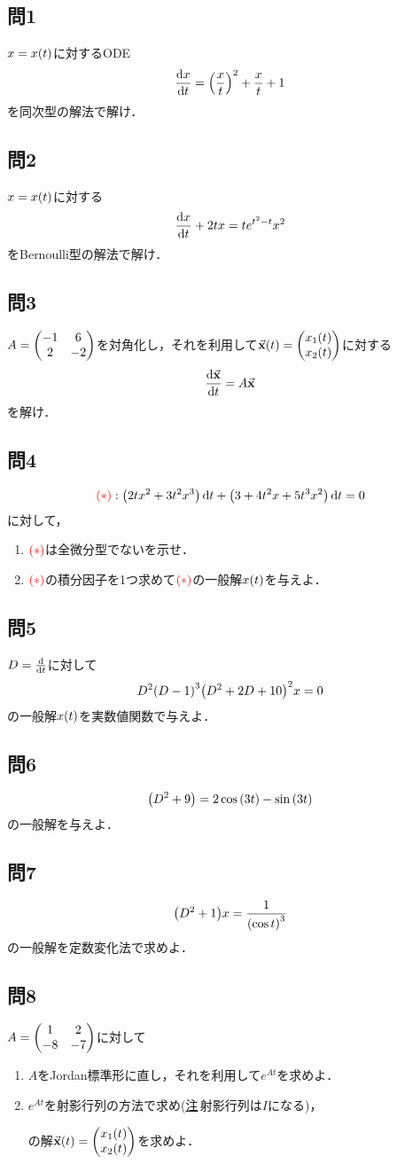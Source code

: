 \documentclass[autodetect-engine,dvipdfmx-if-dvi,ja=standard]{bxjsarticle}
\theoremstyle{mystyle1}
\theoremstyle{mystyle2}
\newcommand{\redast}{\ensuremath{\color{red}\qty(\ast)\color{black}}}
\begin{document}
\subsection*{問1}
$x=x\qty(t)$に対するODE
\[\dv{x}{t}=\qty(\frac{x}{t})^2+\frac{x}{t}+1\]
を同次型の解法で解け．
\subsection*{問2}
$x=x\qty(t)$に対する
\[\dv{x}{t}+2tx=te^{t^2-t}x^2\]
をBernoulli型の解法で解け．
\subsection*{問3}
$A=\mqty(-1 & 6 \\ 2 & -2)$を対角化し，それを利用して$\va{x}\qty(t)=\mqty(x_1\qty(t)\\x_2\qty(t))$に対する
\[\dv{\va{x}}{t}=A\va{x}\]
を解け．
\subsection*{問4}
\[\redast:\qty(2tx^2+3t^2x^3)\dd{t}+\qty(3+4t^2x+5t^3x^2)\dd{t}=0\]
に対して，
\begin{enumerate}
  \item \redast は全微分型でないを示せ．
  \item \redast の積分因子を1つ求めて\redast の一般解$x\qty(t)$を与えよ．
\end{enumerate}
\subsection*{問5}
$D=\dv{t}$に対して
\[D^2\qty(D-1)^3\qty(D^2+2D+10)^2x=0\]
の一般解$x\qty(t)$を実数値関数で与えよ．
\subsection*{問6}
\[\qty(D^2+9)=2\cos\qty(3t)-\sin\qty(3t)\]
の一般解を与えよ．
\subsection*{問7}
\[\qty(D^2+1)x=\frac{1}{\qty(\cos t)^3}\]
の一般解を定数変化法で求めよ．
\subsection*{問8}
$A=\mqty(1&2\\-8&-7)$に対して
\begin{enumerate}
  \item $A$をJordan標準形に直し，それを利用して$e^{At}$を求めよ．
  \item $e^{At}$を射影行列の方法で求め(\underline{注}\,射影行列は$I$になる)，
        の解$\va{x}\qty(t)=\mqty(x_1\qty(t)\\x_2\qty(t))$を求めよ．
\end{enumerate}
\end{document}

